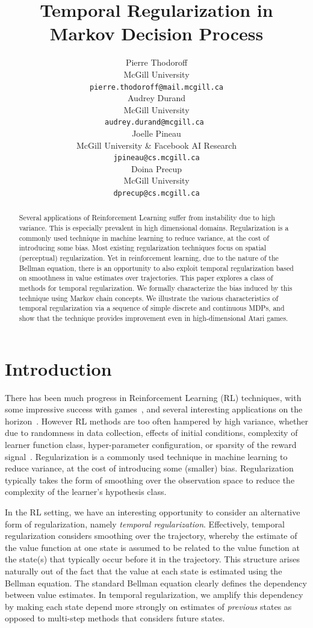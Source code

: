\documentclass{article}
\title{Temporal Regularization in Markov Decision Process}
\author{
  Pierre Thodoroff \\
  McGill University\\
  \texttt{pierre.thodoroff@mail.mcgill.ca} \\
   \And
   Audrey Durand \\
   McGill University \\
   \texttt{audrey.durand@mcgill.ca } \\
   \AND
   Joelle Pineau \\
   McGill University \& Facebook AI Research\\
   \texttt{jpineau@cs.mcgill.ca} \\
   \And
   Doina Precup \\
   McGill University \\
   \texttt{dprecup@cs.mcgill.ca} \\
}
\begin{document}


\maketitle
\begin{abstract}
Several applications of Reinforcement Learning suffer from instability due to high variance. This is especially prevalent in high dimensional domains. Regularization is a commonly used technique in machine learning to reduce variance, at the cost of introducing some bias. Most existing regularization techniques focus on spatial (perceptual) regularization.  Yet in reinforcement learning, due to the nature of the Bellman equation, there is an opportunity to also exploit temporal regularization based on smoothness in value estimates over trajectories.  This paper explores a class of methods for temporal regularization. We formally characterize the bias induced by this technique using Markov chain concepts. We illustrate the various characteristics of temporal regularization via a sequence of simple discrete and continuous MDPs, and show that the technique provides improvement even in high-dimensional Atari games.

\end{abstract}

\section{Introduction}
There has been much progress in Reinforcement Learning (RL) techniques, with some impressive success with games~\citep{silver16}, and several interesting applications on the horizon~\citep{koedinger18,shortreed11,prasad17,dhingra17}. However RL methods are too often hampered by high variance, whether due to randomness in data collection, effects of initial conditions, complexity of learner function class, hyper-parameter configuration, or sparsity of the reward signal~\citep{henderson18}.
Regularization is a commonly used technique in machine learning to reduce variance, at the cost of introducing some (smaller) bias.  Regularization typically takes the form of smoothing over the observation space to reduce the complexity of the learner's hypothesis class.

In the RL setting, we have an interesting opportunity to consider an alternative form of regularization, namely \emph{temporal regularization}.  Effectively, temporal regularization considers smoothing over the trajectory, whereby the estimate of the value function at one state is assumed to be related to the value function at the state(s) that typically occur before it in the trajectory. This structure arises naturally out of the fact that the value at each state is estimated using the Bellman equation. The standard Bellman equation clearly defines the dependency between value estimates. In temporal regularization, we amplify this dependency by making each state depend more strongly on estimates of \emph{previous} states as opposed to multi-step methods that considers future states. 
\end{document}
